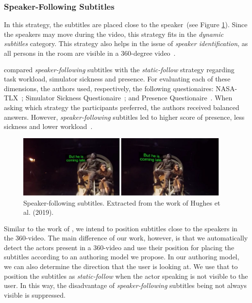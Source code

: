 \subsubsection{Speaker-Following Subtitles}
\label{subsubsec:speaker_following}

In this strategy, the subtitles are placed close to the speaker~(see Figure \ref{fig:speaker_following}). Since the speakers may move during the video, this strategy fits in the \emph{dynamic subtitles} category. This strategy also helps in the issue of \emph{speaker identification}, as all persons in the room are visible in a 360-degree video~\cite{rothe_dynamic_2018}.  

\cite{rothe_dynamic_2018} compared \emph{speaker-following} subtitles with the \emph{static-follow} strategy regarding task workload, simulator sickness and presence. For evaluating each of these dimensions, the authors used, respectively, the following questionaires: NASA-TLX~\cite{nasa_hart1988development}; Simulator Sickness Questionaire~\cite{sickness_kennedy1993simulator}; and Presence Questionaire~\cite{presence_witmer1998measuring}. When asking which strategy the participants preferred, the authors received balanced answers. However, \emph{speaker-following} subtitles led to higher score of presence, less sickness and lower workload~\cite{rothe_dynamic_2018}.

\begin{figure}[!ht]
    \centering
    \includegraphics[width=0.95\textwidth]{img/video360/speaker-following.png}
    \caption{Speaker-following subtitles. Extracted from the work of Hughes et al. (2019).}
    \label{fig:speaker_following}
\end{figure}


Similar to the work of \cite{rothe_dynamic_2018}, we intend to position subtitles close to the speakers in the 360-video. The main difference of our work, however, is that we automatically detect the actors present in a 360-video and use their position for placing the subtitles according to an authoring model we propose. In our authoring model, we can also determine the direction that the user is looking at. We use that to position the subtitles as \emph{static-follow} when the actor speaking is not visible to the user. In this way, the disadvantage of \emph{speaker-following} subtitles being not always visible is suppressed.